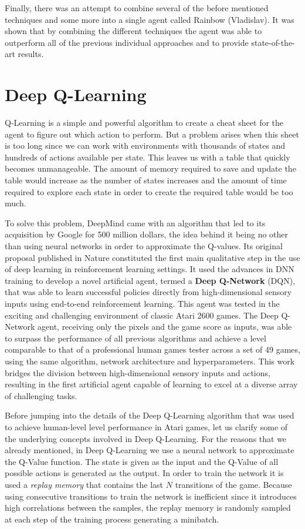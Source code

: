 \documentclass{article}
\begin{document}
Finally, there was an attempt to combine several of the before mentioned techniques and some more into
a single agent called Rainbow \cite{DeepMindRainbow} (Vladislav). It was shown that by combining
the different techniques the agent was able to outperform all of the previous individual approaches
and to provide state-of-the-art results.

\section{Deep Q-Learning}

Q-Learning is a simple and powerful algorithm to create a cheat sheet for the agent to figure out which
action to perform. But a problem arises when this sheet is too long since we can work with environments
with thousands of states and hundreds of actions available per state. This leaves us with a table that
quickly becomes unmanageable. The amount of memory required to save and update the table would increase as
the number of states increases and the amount of time required to explore each state in order to create
the required table would be too much.

To solve this problem, DeepMind came with an algorithm that led to its acquisition by Google for 500
million dollars, the idea behind it being no other than using neural networks in order to approximate the
Q-values. Its original proposal published in Nature \cite{mnih2015humanlevel} constituted the first main
qualitative step in the use of deep learning in reinforcement learning settings. It used the advances in
DNN training to develop a novel artificial agent, termed a \textbf{Deep Q-Network} (DQN), that was able to
learn successful policies directly from high-dimensional sensory inputs using end-to-end reinforcement
learning. This agent was tested in the exciting and challenging environment of classic Atari 2600 games.
The Deep Q-Network agent, receiving only the pixels and the game score as inputs, was able to surpass the
performance of all previous algorithms and achieve a level comparable to that of a professional human games
tester across a set of 49 games, using the same algorithm, network architecture and hyperparameters. This
work bridges the division between high-dimensional sensory inputs and actions, resulting in the first
artificial agent capable of learning to excel at a diverse array of challenging tasks.

Before jumping into the details of the Deep Q-Learning algorithm that was used to achieve human-level
level performance in Atari games, let us clarify some of the underlying concepts involved in Deep
Q-Learning. For the reasons that we already mentioned, in Deep Q-Learning we use a neural network to
approximate the Q-Value function. The state is given as the input and the Q-Value of all possible actions
is generated as the output. In order to train the network it is used a \emph{replay memory} that
contains the last $N$ transitions of the game. Because using consecutive transitions to train the
network is inefficient since it introduces high correlations between the samples, the replay memory
is randomly sampled at each step of the training process generating a minibatch.
\end{document}
